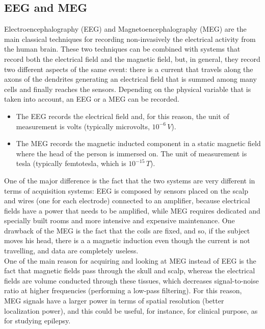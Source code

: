 \subsection{EEG and MEG}
Electroencephalography (EEG) and Magnetoencephalography (MEG) are the main classical techniques for recording 
non-invasively the electrical activity from the human brain. These two techniques can be combined with systems 
that record both the electrical field and the magnetic field, but, in general, they record two different aspects 
of the same event: there is a current that travels along the axons of the dendrites generating an electrical 
field that is summed among many cells and finally reaches the sensors. Depending on the physical variable that is 
taken into account, an EEG or a MEG can be recorded.
\begin{itemize}
    \item The EEG records the electrical field and, for this reason, the unit of measurement is volts (typically 
    microvolts, \(10^{-6}\,V\)).
    \item The MEG records the magnetic inducted component in a static magnetic field where the head of the person is 
    immersed on. The unit of measurement is tesla (typically femtotesla, which is \(10^{-15}\,T\)).
\end{itemize}
One of the major difference is the fact that the two systems are very different in terms of acquisition systems: EEG 
is composed by sensors placed on the scalp and wires (one for each electrode) connected to an amplifier, because 
electrical fields have a power that needs to be amplified, while MEG requires dedicated and specially built rooms and 
more intensive and expensive maintenance.
One drawback of the MEG is the fact that the coils are fixed, and so, if the subject moves his head, there is a 
a magnetic induction even though the current is not travelling, and data are completely useless.\\
One of the main reason for acquiring and looking at MEG instead of EEG is the fact that magnetic fields pass through the 
skull and scalp, whereas the electrical fields are volume conducted through these tissues, which decreases 
signal-to-noise ratio at higher frequencies (performing a low-pass filtering). For this reason, MEG signals have a 
larger power in terms of spatial resolution (better localization power), and this could be useful, for instance, 
for clinical purpose, as for studying epilepsy.


